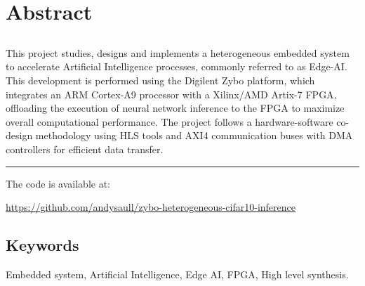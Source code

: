 \chapter*{Abstract}

\section*{\tituloPortadaEngVal}

This project studies, designs and implements a heterogeneous embedded system to
accelerate Artificial Intelligence processes, commonly referred to as Edge-AI.
This development is performed using the Digilent Zybo platform, which integrates an \acs{ARM}
Cortex-A9 processor with a Xilinx/AMD Artix-7 \acs{FPGA}, offloading the execution of neural
network inference to the \acs{FPGA} to maximize overall computational performance.
The project follows a hardware-software co-design methodology using
\acs{HLS} tools and \acs{AXI}4 communication buses with \acs{DMA} controllers for
efficient data transfer.

\bigskip
\noindent\rule{\textwidth}{0.4pt}
\bigskip
The code is available at:

\url{https://github.com/andysaull/zybo-heterogeneous-cifar10-inference}

\section*{Keywords}

Embedded system, Artificial Intelligence, Edge AI, FPGA, High level synthesis.
